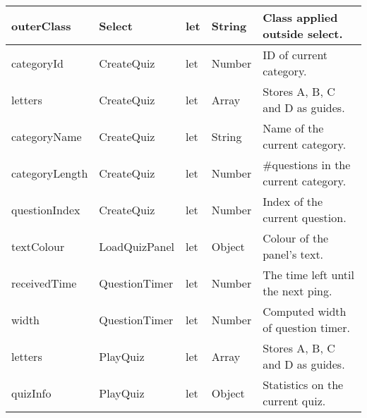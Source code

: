 \begin{longtable}{|l|l|l|l|l|}
outerClass                          & Select                               & let                                & String                               & Class applied outside select.         \\ \hline
categoryId                          & CreateQuiz                           & let                                & Number                               & ID of current category.               \\ \hline
letters                             & CreateQuiz                           & let                                & Array                                & Stores A, B, C and D as guides.       \\ \hline
categoryName                        & CreateQuiz                           & let                                & String                               & Name of the current category.         \\ \hline
categoryLength                      & CreateQuiz                           & let                                & Number                               & \#questions in the current category.  \\ \hline
questionIndex                       & CreateQuiz                           & let                                & Number                               & Index of the current question.        \\ \hline
textColour                          & LoadQuizPanel                        & let                                & Object                               & Colour of the panel's text.           \\ \hline
receivedTime                        & QuestionTimer                        & let                                & Number                               & The time left until the next ping.    \\ \hline
width                               & QuestionTimer                        & let                                & Number                               & Computed width of question timer.     \\ \hline
letters                             & PlayQuiz                             & let                                & Array                                & Stores A, B, C and D as guides.       \\ \hline
quizInfo                            & PlayQuiz                             & let                                & Object                               & Statistics on the current quiz.       \\ \hline

\end{longtable}
